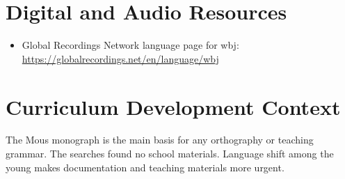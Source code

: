 \documentclass[12pt]{article}
\begin{document}
\section{Digital and Audio Resources}
\begin{itemize}
\item Global Recordings Network language page for wbj: \url{https://globalrecordings.net/en/language/wbj}
\end{itemize}

\section{Curriculum Development Context}
The Mous monograph is the main basis for any orthography or teaching grammar. The searches found no school materials. Language shift among the young makes documentation and teaching materials more urgent.
\end{document}
